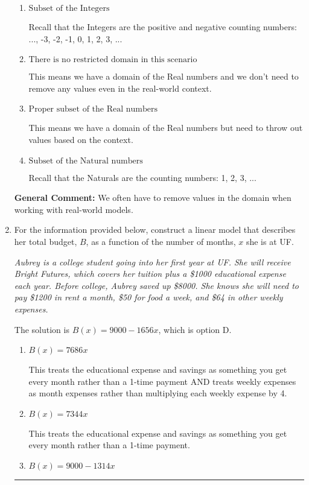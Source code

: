 \documentclass{extbook}[14pt]
\newcommand{\litem}[1]{\item #1

\rule{\textwidth}{0.4pt}}
\begin{document}
\begin{enumerate}
{\begin{enumerate}[label=\Alph*.]
Recall that the Rationals are fractions with Integers in the numerator and denominator.
\item \( \text{Subset of the Integers} \)

Recall that the Integers are the positive and negative counting numbers: ..., -3, -2, -1, 0, 1, 2, 3, ... 
\item \( \text{There is no restricted domain in this scenario} \)

This means we have a domain of the Real numbers and we don't need to remove any values even in the real-world context.
\item \( \text{Proper subset of the Real numbers} \)

This means we have a domain of the Real numbers but need to throw out values based on the context.
\item \( \text{Subset of the Natural numbers} \)

Recall that the Naturals are the counting numbers: 1, 2, 3, ...
\end{enumerate}

\textbf{General Comment:} We often have to remove values in the domain when working with real-world models.
}
\litem{
For the information provided below, construct a linear model that describes her total budget, $B$, as a function of the number of months, $x$ she is at UF.

\begin{center}
    \textit{ Aubrey is a college student going into her first year at UF. She will receive Bright Futures, which covers her tuition plus a \$1000 educational expense each year. Before college, Aubrey saved up \$8000. She knows she will need to pay \$1200 in rent a month, \$50 for food a week, and \$64 in other weekly expenses. }
\end{center}


The solution is \( B(x) = 9000 - 1656 x \), which is option D.\begin{enumerate}[label=\Alph*.]
\item \( B(x) = 7686 x \)

This treats the educational expense and savings as something you get every month rather than a 1-time payment AND treats weekly expenses as month expenses rather than multiplying each weekly expense by 4.
\item \( B(x) = 7344 x \)

This treats the educational expense and savings as something you get every month rather than a 1-time payment.
\item \( B(x) = 9000 - 1314 x \)


\end{enumerate}}
\end{enumerate}
\end{document}
